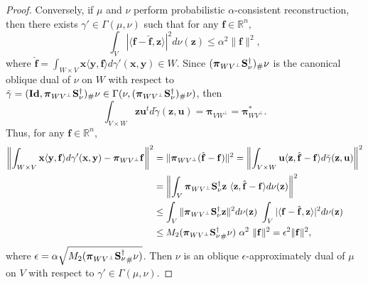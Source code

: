 \documentclass{amsart}
\numberwithin{equation}{section}
\newcommand{\bpi}{{\boldsymbol{\pi}}}
\theoremstyle{plain}
\theoremstyle{remark}
\theoremstyle{definition}
\begin{document}
\begin{proof}
Conversely, if $\mu$ and $\nu$ perform probabilistic $\alpha$-consistent reconstruction, then there exists $\gamma' \in \Gamma(\mu, \nu)$ such that for any $\mathbf{f} \in \mathbb{R}^n$, 
$$
  \int_{V} |\langle \mathbf{f} - \hat{\mathbf{f}}, \mathbf{z} \rangle|^2 d\nu(\mathbf{z}) \leq \alpha^2 \|\mathbf{f}\|^2,
  $$
  where $\hat{\mathbf{f}} = \int_{W \times V} \mathbf{x} \langle \mathbf{y, f} \rangle d\gamma'(\mathbf{x}, \mathbf{y})  \in W$. 
Since $ ({\bpi_{WV^\perp}{\bf S}_\nu^{\dagger}})_\#\nu$ is the canonical oblique dual of $\nu$ on $W$ with respect to $\tilde{\gamma} = (\mathbf{Id}, \bpi_{WV^\perp}{\bf S}_\nu^{\dagger})_\#\nu \in \Gamma(\nu, ({\bpi_{WV^\perp}{\bf S}_\nu^{\dagger}})_\#\nu)$, then 
\begin{equation*}
    \int_{V \times W} \mathbf{z} \mathbf{u}^t d\tilde{\gamma}(\mathbf{z}, \mathbf{u}) = \bpi_{VW^\perp} = \bpi_{WV^\perp}^*.
\end{equation*}
Thus, for any $\mathbf{f} \in \mathbb{R}^n$, 
\begin{equation*}
    \begin{split}
        \left \|\int_{W \times V} \mathbf{x} \langle \mathbf{y, f} \rangle d\gamma'(\mathbf{x}, \mathbf{y}) - \bpi_{WV^\perp} \mathbf{f} \right\|^2 &=  \|\bpi_{WV^\perp}(\hat{\mathbf{f}} - \mathbf{f})\|^2 =  \left \| \int_{V \times W} \mathbf{u} \langle \mathbf{z}, \hat{\mathbf{f}} - \mathbf{f} \rangle d\tilde{\gamma}(\mathbf{z}, \mathbf{u}) \right \|^2\\
        &= \left \| \int_{V} \bpi_{WV^\perp}{\bf S}_\nu^{\dagger} \mathbf{z} \ \langle \mathbf{z}, \hat{\mathbf{f}} - \mathbf{f} \rangle d\nu(\mathbf{z}) \right \|^2 \\
        & \leq \int_{V} \|\bpi_{WV^\perp}{\bf S}_\nu^{\dagger} \mathbf{z}\|^2 d \nu(\mathbf{z}) \ \int_{V} |\langle \mathbf{f} - \hat{\mathbf{f}}, \mathbf{z} \rangle|^2 d\nu(\mathbf{z}) \\
        &\leq M_2({\bpi_{WV^\perp}{\bf S}_\nu^{\dagger}}_\#\nu) \ \alpha^2 
        \ \|\mathbf{f}\|^2 = \epsilon^2 \|\mathbf{f}\|^2, 
    \end{split}
\end{equation*}
where $\epsilon = \alpha \sqrt{M_2({\bpi_{WV^\perp}{\bf S}_\nu^{\dagger}}_\#\nu)} $. Then $\nu$ is an oblique $\epsilon$-approximately dual of $\mu$ on $V$ with respect to $\gamma' \in \Gamma(\mu, \nu)$. 
\end{proof}
\end{document}

